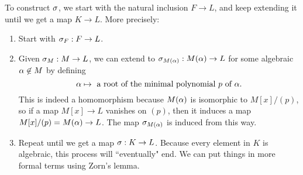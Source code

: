 To construct $\sigma$, we start with the natural inclusion $F \rightarrow L$, and keep extending it until we get a map $K \rightarrow L$. More precisely:
\begin{enumerate}
    \item Start with $\sigma_F : F \rightarrow L$.
    \item Given $\sigma_M: M \rightarrow L$, we can extend to $\sigma_{M(\alpha)}: M(\alpha) \rightarrow L$ for some algebraic $\alpha \not \in M$ by defining
        \[
            \alpha \mapsto \text{ a root of the minimal polynomial $p$ of $\alpha$.}
        \]
        This is indeed a homomorphism because $M(\alpha)$ is isomorphic to $M[x]/(p)$, so if a map $M[x] \rightarrow L$ vanishes on $(p)$, then it induces a map $M[x]/(p) = M(\alpha) \rightarrow L$. The map $\sigma_{M(\alpha)}$ is induced from this way.
    \item Repeat until we get a map $\sigma: K \rightarrow L$. Because every element in $K$ is algebraic, this process will ``eventually" end. We can put things in more formal terms using Zorn's lemma.
\end{enumerate}
